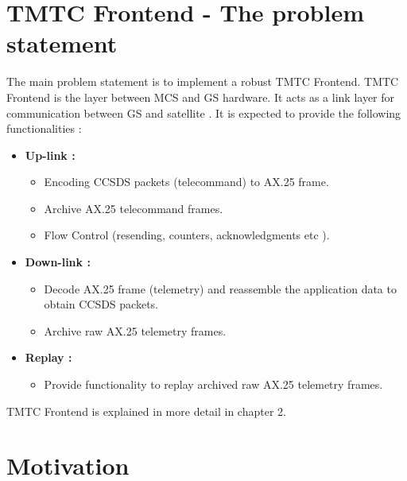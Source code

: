\documentclass[BTech]{iitmdiss}
\begin{document}
 \section{TMTC Frontend - The problem statement}
The main problem statement is to implement a robust TMTC Frontend. TMTC Frontend is the layer between MCS and GS hardware. It acts as a link layer for communication between GS and satellite . It is expected to provide the following functionalities :
\begin{itemize}
\item \textbf{Up-link : } 
\begin{itemize}
\item Encoding CCSDS packets (telecommand) to AX.25 frame.
\item Archive AX.25 telecommand frames.
\item Flow Control (resending, counters, acknowledgments etc ).

\end{itemize}
\item \textbf{Down-link : }
\begin{itemize}
\item Decode AX.25 frame (telemetry) and reassemble the application data to obtain CCSDS packets.
\item Archive raw AX.25  telemetry frames. 

\end{itemize}
\item \textbf{Replay : }
\begin{itemize}
\item Provide functionality to replay archived raw AX.25 telemetry frames.
\end{itemize}
\end{itemize}
TMTC Frontend is explained in more detail in chapter 2. 
 
 \section{Motivation}
 
\end{document}
